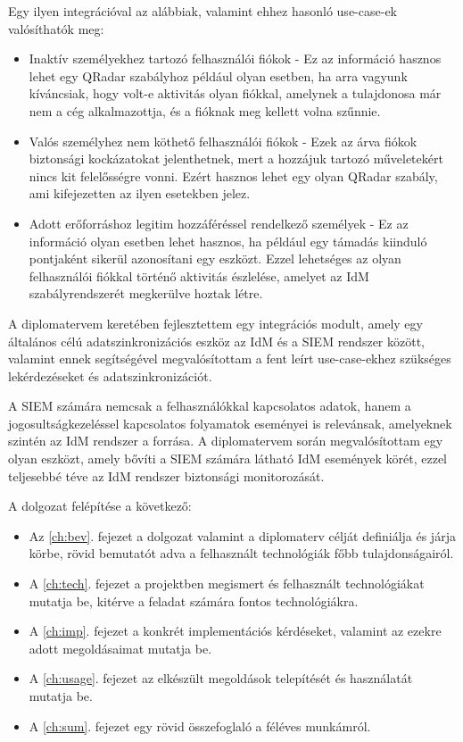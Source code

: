 Egy ilyen integrációval az alábbiak, valamint ehhez hasonló use-case-ek valósíthatók meg:

\begin{itemize}
	\item Inaktív személyekhez tartozó felhasználói fiókok - Ez az információ hasznos lehet egy QRadar szabályhoz például olyan esetben, ha arra vagyunk kíváncsiak, hogy volt-e aktivitás olyan fiókkal, amelynek a tulajdonosa már nem a cég alkalmazottja, és a fióknak meg kellett volna szűnnie.
	
	\item Valós személyhez nem köthető felhasználói fiókok - Ezek az árva fiókok biztonsági kockázatokat jelenthetnek, mert a hozzájuk tartozó műveletekért nincs kit felelősségre vonni. Ezért hasznos lehet egy olyan QRadar szabály, ami kifejezetten az ilyen esetekben jelez.
	
	\item Adott erőforráshoz legitim hozzáféréssel rendelkező személyek - Ez az információ olyan esetben lehet hasznos, ha például egy támadás kiinduló pontjaként sikerül azonosítani egy eszközt. Ezzel lehetséges az olyan felhasználói fiókkal történő aktivitás észlelése, amelyet az IdM szabályrendszerét megkerülve hoztak létre.
\end{itemize}

A diplomatervem keretében fejlesztettem egy integrációs modult, amely egy általános célú adatszinkronizációs eszköz az IdM és a SIEM rendszer között, valamint ennek segítségével megvalósítottam a fent leírt use-case-ekhez szükséges lekérdezéseket és adatszinkronizációt.

A SIEM számára nemcsak a felhasználókkal kapcsolatos adatok, hanem a jogosultságkezeléssel kapcsolatos folyamatok eseményei is relevánsak, amelyeknek szintén az IdM rendszer a forrása. A diplomatervem során megvalósítottam egy olyan eszközt, amely bővíti a SIEM számára látható IdM események körét, ezzel teljesebbé téve az IdM rendszer biztonsági monitorozását.

A dolgozat felépítése a következő:

\begin{itemize}
	\item Az \ref{ch:bev}. fejezet a dolgozat valamint a diplomaterv célját definiálja és járja körbe, rövid bemutatót adva a felhasznált technológiák főbb tulajdonságairól.
	
	\item A \ref{ch:tech}. fejezet a projektben megismert és felhasznált technológiákat mutatja be, kitérve a feladat számára fontos technológiákra.
	
	\item A \ref{ch:imp}. fejezet a konkrét implementációs kérdéseket, valamint az ezekre adott megoldásaimat mutatja be.
	
	\item A \ref{ch:usage}. fejezet az elkészült megoldások telepítését és használatát mutatja be.
	
	\item A \ref{ch:sum}. fejezet egy rövid összefoglaló a féléves munkámról.
	
\end{itemize}

